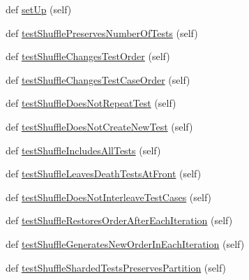 \begin{DoxyCompactItemize}
\item 
def \hyperlink{classgtest__shuffle__test_1_1_g_test_shuffle_unit_test_adf9841ae9c86eaafc3c3f7c9690c7bd8}{set\+Up} (self)
\item 
def \hyperlink{classgtest__shuffle__test_1_1_g_test_shuffle_unit_test_aafc33d6129c37043ef5c95dbe766a8db}{test\+Shuffle\+Preserves\+Number\+Of\+Tests} (self)
\item 
def \hyperlink{classgtest__shuffle__test_1_1_g_test_shuffle_unit_test_a0ba25ee553b62281e16b6a28873abc01}{test\+Shuffle\+Changes\+Test\+Order} (self)
\item 
def \hyperlink{classgtest__shuffle__test_1_1_g_test_shuffle_unit_test_a8a82320ea310d1e3660bef2efb665bd2}{test\+Shuffle\+Changes\+Test\+Case\+Order} (self)
\item 
def \hyperlink{classgtest__shuffle__test_1_1_g_test_shuffle_unit_test_a7537baa50e9e14b430fb80eaf4ea18f6}{test\+Shuffle\+Does\+Not\+Repeat\+Test} (self)
\item 
def \hyperlink{classgtest__shuffle__test_1_1_g_test_shuffle_unit_test_aeea745f7ce2ab19a067c5cde6e083ba7}{test\+Shuffle\+Does\+Not\+Create\+New\+Test} (self)
\item 
def \hyperlink{classgtest__shuffle__test_1_1_g_test_shuffle_unit_test_ab9e25e62817f7cdbd32833f9b2be5794}{test\+Shuffle\+Includes\+All\+Tests} (self)
\item 
def \hyperlink{classgtest__shuffle__test_1_1_g_test_shuffle_unit_test_a6fa91b262595e35bd3e9b52e188dc634}{test\+Shuffle\+Leaves\+Death\+Tests\+At\+Front} (self)
\item 
def \hyperlink{classgtest__shuffle__test_1_1_g_test_shuffle_unit_test_a34bfc9696191f4c2782327e1e35ae902}{test\+Shuffle\+Does\+Not\+Interleave\+Test\+Cases} (self)
\item 
def \hyperlink{classgtest__shuffle__test_1_1_g_test_shuffle_unit_test_a77b83a9870ad8d68524e1177f5320fb0}{test\+Shuffle\+Restores\+Order\+After\+Each\+Iteration} (self)
\item 
def \hyperlink{classgtest__shuffle__test_1_1_g_test_shuffle_unit_test_ada78bae27e0d82d07bd663d53a36552b}{test\+Shuffle\+Generates\+New\+Order\+In\+Each\+Iteration} (self)
\item 
def \hyperlink{classgtest__shuffle__test_1_1_g_test_shuffle_unit_test_abd33c5ef01ce6d1d025ebcc816d47c19}{test\+Shuffle\+Sharded\+Tests\+Preserves\+Partition} (self)
\end{DoxyCompactItemize}


